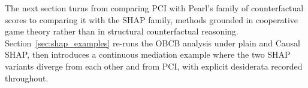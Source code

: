 The next section turns from comparing PCI with Pearl's family of counterfactual scores
to comparing it with the SHAP family, methods grounded in cooperative game theory
rather than in structural counterfactual reasoning.
Section~\ref{sec:shap_examples} re-runs the OBCB analysis under plain and Causal
SHAP, then introduces a continuous mediation example where the two SHAP variants
diverge from each other and from PCI, with explicit desiderata recorded throughout.

